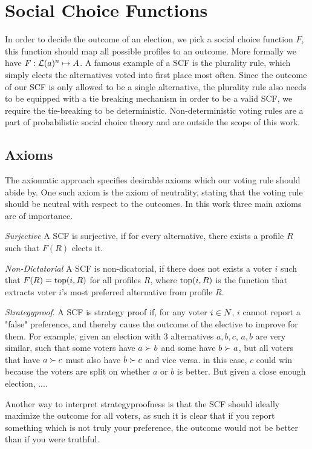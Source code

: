 \section{Social Choice Functions}
\label{sec:SCF}
In order to decide the outcome of an election, we pick a social choice function $F$, this function should map all possible profiles to an outcome. More formally we have $F: \mathcal{L}(a)^n \mapsto A$. A famous example of a SCF is the plurality rule, which simply elects the alternatives voted into first place most often. Since the outcome of our SCF is only allowed to be a single alternative, the plurality rule also needs to be equipped with a tie breaking mechanism in order to be a valid SCF, we require the tie-breaking to be deterministic. Non-deterministic voting rules are a part of probabilistic social choice theory and are outside the scope of this work.

\subsection{Axioms}
The axiomatic approach specifies desirable axioms which our voting rule should abide by. One such axiom is the axiom of neutrality, stating that the voting rule should be neutral with respect to the outcomes. In this work three main axioms are of importance.

\textit{Surjective} A SCF is surjective, if for every alternative, there exists a profile $R$ such that $F(R)$ elects it.

\textit{Non-Dictatorial} A SCF is non-dicatorial, if there does not exists a voter $i$ such that $F(R) = \textnormal{top}(i,R)$ for all profiles $R$, where $\textnormal{top}(i,R)$ is the function that extracts voter $i$'s most preferred alternative from profile $R$.

\textit{Strategyproof}. A SCF is strategy proof if, for any voter $i \in N$, $i$ cannot report a "false" preference, and thereby cause the outcome of the elective to improve for them. For example, given an election with 3 alternatives $a, b, c$, $a,b$  are very similar, such that some voters have $a \succ b$ and some have $ b \succ a $, but all voters that have $a \succ c$ must also have $b \succ c$ and vice versa. in this case, $c$ could win because the voters are split on whether $a$ or $b$ is better. But given a close enough election, .... %

Another way to interpret strategyproofness is that the SCF should ideally maximize the outcome for all voters, as such it is clear that if you report something which is not truly your preference, the outcome would not be better than if you were truthful.



